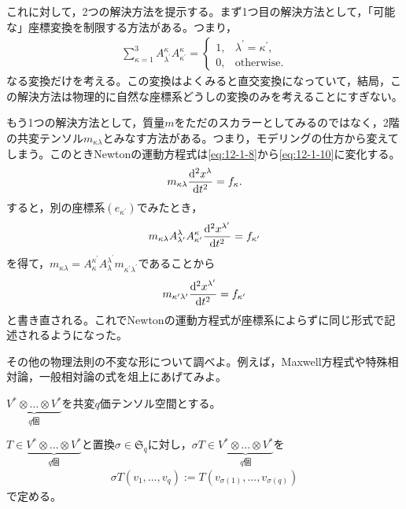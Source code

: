 \documentclass[uplatex]{jsarticle}
\begin{document}
これに対して，2つの解決方法を提示する。まず1つ目の解決方法として，「可能な」座標変換を制限する方法がある。つまり，
\begin{align*}
  \sum_{\kappa=1}^{3} A_{\lambda^{\prime}}^{\kappa} A_{\kappa^{\prime}}^{\kappa} = \begin{cases}
    1, & \lambda^{\prime} = \kappa^{\prime}, \\
    0, & \text{otherwise}.
  \end{cases}
\end{align*}
なる変換だけを考える。この変換はよくみると直交変換になっていて，結局，この解決方法は物理的に自然な座標系どうしの変換のみを考えることにすぎない。

もう1つの解決方法として，質量$m$をただのスカラーとしてみるのではなく，2階の共変テンソル$m_{\kappa\lambda}$とみなす方法がある。つまり，モデリングの仕方から変えてしまう。このときNewtonの運動方程式は\eqref{eq:12-1-8}から\eqref{eq:12-1-10}に変化する。
\begin{align}
  m_{\kappa\lambda} \dfrac{\mathrm{d}^{2}x^{\lambda}}{\mathrm{d}t^{2}} = f_{\kappa}. \label{eq:12-1-10}
\end{align}
すると，別の座標系$(e_{\kappa^{\prime}})$でみたとき，
\begin{align}
  m_{\kappa \lambda} A^{\lambda}_{\lambda^{\prime}} A^{\kappa}_{\kappa^{\prime}} \dfrac{\mathrm{d}^{2} x^{\lambda^{\prime}}}{\mathrm{d}t^{2}} = f_{\kappa^{\prime}}
\end{align}
を得て，$m_{\kappa \lambda} = A_{\kappa}^{\kappa^{\prime}} A_{\lambda}^{\lambda^{\prime}} m_{\kappa^{\prime} \lambda^{\prime}}$であることから
\begin{align}
  m_{\kappa^{\prime}\lambda^{\prime}} \dfrac{\mathrm{d}^{2}x^{\lambda^{\prime}}}{\mathrm{d}t^{2}} = f_{\kappa^{\prime}}
\end{align}
と書き直される。これでNewtonの運動方程式が座標系によらずに同じ形式で記述されるようになった。

\sukima{} その他の物理法則の不変な形について調べよ。例えば，Maxwell方程式や特殊相対論，一般相対論の式を俎上にあげてみよ。


\sukima{}\par
$\underbrace{V^{*} \otimes \dots \otimes V^{*}}_{q\text{個}}$を共変$q$価テンソル空間とする。

\begin{teigi}
  $T \in \underbrace{V^{*} \otimes \dots \otimes V^{*}}_{q\text{個}}$と置換$\sigma \in \mathfrak{S}_{q}$に対し，$\sigma T \in \underbrace{V^{*} \otimes \dots \otimes V^{*}}_{q\text{個}}$を
  \begin{align*}
    \sigma T (v_{1}, \dots, v_{q}) := T(v_{\sigma(1)}, \dots, v_{\sigma(q)})
  \end{align*}
  で定める。
\end{teigi}
\end{document}
